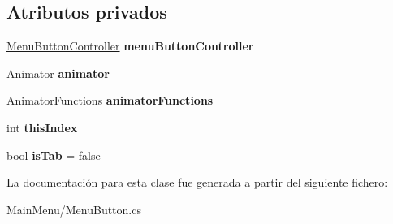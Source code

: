 \subsection*{Atributos privados}
\begin{DoxyCompactItemize}
\item 
\mbox{\label{class_menu_button_ac51f366dac675dc93ed0b86d95c7158d}} 
\mbox{\hyperlink{class_menu_button_controller}{Menu\+Button\+Controller}} {\bfseries menu\+Button\+Controller}
\item 
\mbox{\label{class_menu_button_a0ee95efb09b41b4425cef7061de7ccde}} 
Animator {\bfseries animator}
\item 
\mbox{\label{class_menu_button_a39ab838425a9afd58b7c9321c8cd7137}} 
\mbox{\hyperlink{class_animator_functions}{Animator\+Functions}} {\bfseries animator\+Functions}
\item 
\mbox{\label{class_menu_button_a71f45b66791e5642a06f4e9af8348b97}} 
int {\bfseries this\+Index}
\item 
\mbox{\label{class_menu_button_af9d41fdb1f2d7fe041d01fc962e2352e}} 
bool {\bfseries is\+Tab} = false
\end{DoxyCompactItemize}


La documentación para esta clase fue generada a partir del siguiente fichero\+:\begin{DoxyCompactItemize}
\item 
Main\+Menu/Menu\+Button.\+cs\end{DoxyCompactItemize}
